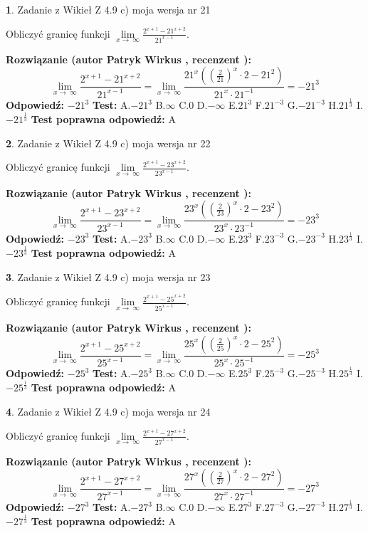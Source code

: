 \documentclass[12pt, a4paper]{article}
\theoremstyle{definition} %
\newtheorem{zad}{}
\newcommand{\zadStart}[1]{\begin{zad}#1\newline}
\newcommand{\zadStop}{\end{zad}}
\newcommand{\rozwStart}[2]{\noindent \textbf{Rozwiązanie (autor #1 , recenzent #2): }\newline}
\newcommand{\rozwStop}{\newline}
\newcommand{\odpStart}{\noindent \textbf{Odpowiedź:}\newline}
\newcommand{\odpStop}{\newline}
\newcommand{\testStart}{\noindent \textbf{Test:}\newline}
\newcommand{\testStop}{\newline}
\newcommand{\kluczStart}{\noindent \textbf{Test poprawna odpowiedź:}\newline}
\newcommand{\kluczStop}{\newline}
\begin{document}
\zadStart{Zadanie z Wikieł Z 4.9 c) moja wersja nr 21}


Obliczyć granicę funkcji  $\lim\limits_{x\to\ \infty}\frac{2^{x+1}-21^{x+2}}{21^{x-1}}$.
\zadStop
\rozwStart{Patryk Wirkus}{}
$$\lim\limits_{x\to\ \infty}\frac{2^{x+1}-21^{x+2}}{21^{x-1}}=\lim\limits_{x\to\ \infty}\frac{21^{x}((\frac{2}{21})^{x}\cdot 2 -21^{2})}{21^{x}\cdot 21^{-1}} = -21^{3}$$
\rozwStop
\odpStart
$-21^{3}$
\odpStop
\testStart
A.$-21^{3}$ B.$\infty$ C.$0$ D.$-\infty$ E.$21^{3}$
F.$21^{-3}$ G.$-21^{-3}$
H.$21^{\frac{1}{3}}$
I.$-21^{\frac{1}{3}}$
\testStop
\kluczStart
A
\kluczStop



\zadStart{Zadanie z Wikieł Z 4.9 c) moja wersja nr 22}


Obliczyć granicę funkcji  $\lim\limits_{x\to\ \infty}\frac{2^{x+1}-23^{x+2}}{23^{x-1}}$.
\zadStop
\rozwStart{Patryk Wirkus}{}
$$\lim\limits_{x\to\ \infty}\frac{2^{x+1}-23^{x+2}}{23^{x-1}}=\lim\limits_{x\to\ \infty}\frac{23^{x}((\frac{2}{23})^{x}\cdot 2 -23^{2})}{23^{x}\cdot 23^{-1}} = -23^{3}$$
\rozwStop
\odpStart
$-23^{3}$
\odpStop
\testStart
A.$-23^{3}$ B.$\infty$ C.$0$ D.$-\infty$ E.$23^{3}$
F.$23^{-3}$ G.$-23^{-3}$
H.$23^{\frac{1}{3}}$
I.$-23^{\frac{1}{3}}$
\testStop
\kluczStart
A
\kluczStop



\zadStart{Zadanie z Wikieł Z 4.9 c) moja wersja nr 23}


Obliczyć granicę funkcji  $\lim\limits_{x\to\ \infty}\frac{2^{x+1}-25^{x+2}}{25^{x-1}}$.
\zadStop
\rozwStart{Patryk Wirkus}{}
$$\lim\limits_{x\to\ \infty}\frac{2^{x+1}-25^{x+2}}{25^{x-1}}=\lim\limits_{x\to\ \infty}\frac{25^{x}((\frac{2}{25})^{x}\cdot 2 -25^{2})}{25^{x}\cdot 25^{-1}} = -25^{3}$$
\rozwStop
\odpStart
$-25^{3}$
\odpStop
\testStart
A.$-25^{3}$ B.$\infty$ C.$0$ D.$-\infty$ E.$25^{3}$
F.$25^{-3}$ G.$-25^{-3}$
H.$25^{\frac{1}{3}}$
I.$-25^{\frac{1}{3}}$
\testStop
\kluczStart
A
\kluczStop



\zadStart{Zadanie z Wikieł Z 4.9 c) moja wersja nr 24}


Obliczyć granicę funkcji  $\lim\limits_{x\to\ \infty}\frac{2^{x+1}-27^{x+2}}{27^{x-1}}$.
\zadStop
\rozwStart{Patryk Wirkus}{}
$$\lim\limits_{x\to\ \infty}\frac{2^{x+1}-27^{x+2}}{27^{x-1}}=\lim\limits_{x\to\ \infty}\frac{27^{x}((\frac{2}{27})^{x}\cdot 2 -27^{2})}{27^{x}\cdot 27^{-1}} = -27^{3}$$
\rozwStop
\odpStart
$-27^{3}$
\odpStop
\testStart
A.$-27^{3}$ B.$\infty$ C.$0$ D.$-\infty$ E.$27^{3}$
F.$27^{-3}$ G.$-27^{-3}$
H.$27^{\frac{1}{3}}$
I.$-27^{\frac{1}{3}}$
\testStop
\kluczStart
A
\kluczStop
\end{document}
